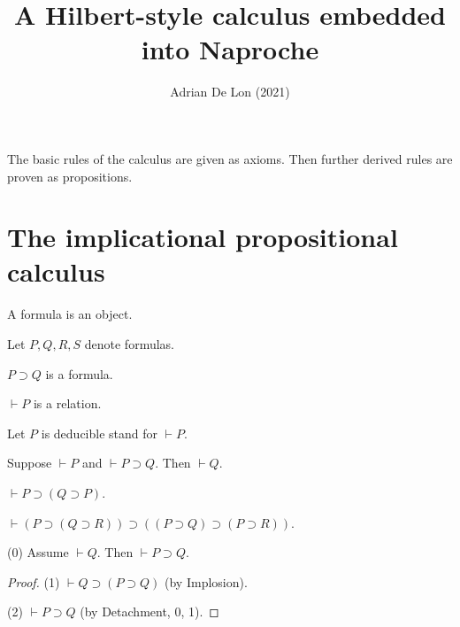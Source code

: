 \documentclass{article}
\title{A Hilbert-style calculus embedded into Naproche}
\author{Adrian De Lon (2021)}
\date{}
\newcommand{\imp}{\supset}
\newcommand{\deducible}{\vdash}
\begin{document}

\maketitle

The basic rules of the calculus are given as axioms.
Then further derived rules are proven as propositions. 

\section{The implicational propositional calculus}

\begin{forthel}

\begin{signature}
    A formula is an object.
\end{signature}
Let $P, Q, R, S$ denote formulas.

\begin{signature}
    $P \imp Q$ is a formula.
\end{signature}

\begin{signature}
    $\deducible P$ is a relation.
\end{signature}
Let $P$ is deducible stand for $\deducible P$.

\begin{axiom}[id=Detachment]
    Suppose $\deducible P$ and $\deducible P \imp Q$.
    Then $\deducible Q$.
\end{axiom}

\begin{axiom}[id=Implosion]
    $\deducible P \imp (Q \imp P)$.
\end{axiom}

\begin{axiom}[id=Chain]
    $\deducible (P \imp (Q \imp R)) \imp ((P \imp Q) \imp (P \imp R))$.
\end{axiom}

\begin{proposition}[id=Weakening]
    (0) Assume $\deducible Q$.
    Then $\deducible P\imp Q$.
\end{proposition}
\begin{proof}
    (1) $\deducible Q\imp (P\imp Q)$ (by Implosion).
    
    (2) $\deducible P\imp Q$ (by Detachment, 0, 1).
\end{proof}


\end{forthel}
\end{document}
